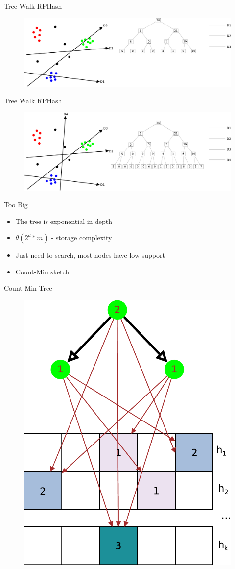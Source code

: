 \documentclass[12pt]{beamer}
\begin{document}
\begin{frame}[plain]{Tree Walk RPHash}
\begin{figure}
 \centerline{\includegraphics[width=.8\textwidth]{figs/cuts/split4}}
\end{figure}
\end{frame}

\begin{frame}[plain]{Tree Walk RPHash}
\begin{figure}
 \centerline{\includegraphics[width=.8\textwidth]{figs/cuts/split5}}
\end{figure}
\end{frame}

\begin{frame}[plain]{Too Big}
\begin{itemize}
 \item The tree is exponential in depth
 \item $\theta(2^d*m)$ - storage complexity
 \item Just need to search, most nodes have low support
 \item Count-Min sketch
\end{itemize}


\end{frame}

\begin{frame}[plain]{Count-Min Tree}
\begin{figure}
 \centerline{\includegraphics[width=.5\textwidth]{figs/countmintree}}
\end{figure}
\end{frame}
\end{document}
